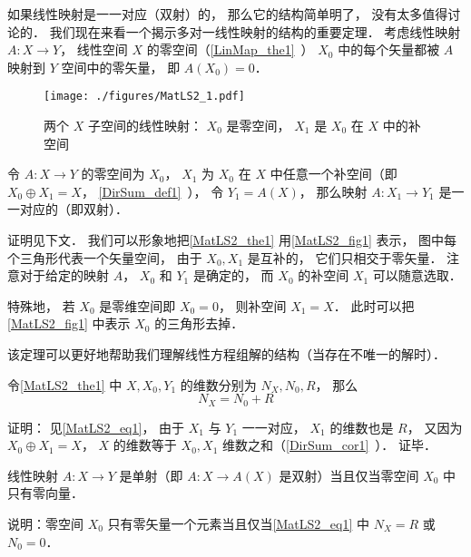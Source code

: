 

如果线性映射是一一对应（双射）的， 那么它的结构简单明了， 没有太多值得讨论的． 我们现在来看一个揭示多对一线性映射的结构的重要定理． 考虑线性映射 $A:X\to Y$， 线性空间 $X$ 的零空间（\autoref{LinMap_the1}~） $X_0$ 中的每个矢量都被 $A$ 映射到 $Y$ 空间中的零矢量， 即 $A(X_0) = \qty{0}$．

\begin{figure}[ht]
\centering
\texttt{[image: ./figures/MatLS2\_1.pdf]}
\caption{两个 $X$ 子空间的线性映射： $X_0$ 是零空间， $X_1$ 是 $X_0$ 在 $X$ 中的补空间} \label{MatLS2_fig1}
\end{figure}

\begin{theorem}{}\label{MatLS2_the1}
令 $A:X \to Y$ 的零空间为 $X_0$， $X_1$ 为 $X_0$ 在 $X$ 中任意一个补空间（即 $X_0\oplus X_1 = X$， \autoref{DirSum_def1}~）， 令 $Y_1 = A(X)$， 那么映射 $A:X_1\to Y_1$ 是一一对应的（即双射）．
\end{theorem}
证明见下文． 我们可以形象地把\autoref{MatLS2_the1} 用\autoref{MatLS2_fig1} 表示， 图中每个三角形代表一个矢量空间， 由于 $X_0, X_1$ 是互补的， 它们只相交于零矢量． 注意对于给定的映射 $A$， $X_0$ 和 $Y_1$ 是确定的， 而 $X_0$ 的补空间 $X_1$ 可以随意选取．

特殊地， 若 $X_0$ 是零维空间即 $X_0 = \qty{0}$， 则补空间 $X_1 = X$． 此时可以把\autoref{MatLS2_fig1} 中表示 $X_0$ 的三角形去掉．

该定理可以更好地帮助我们理解线性方程组解的结构（当存在不唯一的解时）．

\begin{corollary}{}
令\autoref{MatLS2_the1} 中 $X, X_0, Y_1$ 的维数分别为 $N_X, N_0, R$， 那么
\begin{equation}\label{MatLS2_eq1}
N_X = N_0 + R
\end{equation}
\end{corollary}
证明： 见\autoref{MatLS2_eq1}， 由于 $X_1$ 与 $Y_1$ 一一对应， $X_1$ 的维数也是 $R$， 又因为 $X_0\oplus X_1 = X$， $X$ 的维数等于 $X_0, X_1$ 维数之和（\autoref{DirSum_cor1}~）． 证毕．

\begin{corollary}{}
线性映射 $A:X\to Y$ 是单射（即 $A:X\to A(X)$ 是双射）当且仅当零空间 $X_0$ 中只有零向量．
\end{corollary}
说明：零空间 $X_0$ 只有零矢量一个元素当且仅当\autoref{MatLS2_eq1} 中 $N_X = R$ 或 $N_0 = 0$．

